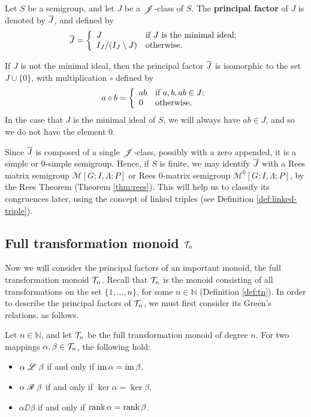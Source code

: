 \begin{definition}
  \label{def:princfact}
  Let $S$ be a semigroup, and let $J$ be a $\mathrel{\mathscr{J}}$-class of $S$.  The
  \textbf{principal factor} of $J$ is denoted by $\overline{J}$, and defined by
  $$\overline{J} = \left\{
    \begin{array}{l l}
      J & \text{if~}J\text{~is the minimal ideal}; \\
      I_J / (I_J \setminus J) & \text{otherwise}.
    \end{array}
  \right.$$
\end{definition}

If $J$ is not the minimal ideal, then the principal factor $\overline{J}$ is
isomorphic to the set $J \cup \{0\}$, with multiplication $\circ$ defined by
$$a \circ b = \left\{
  \begin{array}{l l}
    ab & \text{if~} a,b,ab \in J; \\
    0 & \text{otherwise}.
  \end{array}\right.$$
In the case that $J$ is the minimal ideal of $S$, we will always have
$ab \in J$, and so we do not have the element $0$.

Since $\overline{J}$ is composed of a single $\mathrel{\mathscr{J}}$-class, possibly with a zero
appended, it is a simple or 0-simple semigroup.  Hence, if $S$ is finite, we may
identify $\overline{J}$ with a Rees matrix semigroup $\mathcal{M}[G;I,\Lambda;P]$ or
Rees 0-matrix semigroup $\mathcal{M}^0[G;I,\Lambda;P]$, by the Rees Theorem
(Theorem \ref{thm:rees}).  This will help us to classify its congruences later,
using the concept of linked triples (see Definition \ref{def:linked-triple}).

\subsection{Full transformation monoid $\mathcal{T}_n$}
\label{sec:princfact-tn}

Now we will consider the principal factors of an important monoid, the full
transformation monoid $\mathcal{T}_n$.  Recall that $\mathcal{T}_n$ is the monoid consisting of
all transformations on the set $\{1, \dots, n\}$, for some $n \in \mathbb{N}$
(Definition \ref{def:tn}).  In order to describe the principal factors of
$\mathcal{T}_n$, we must first consider its Green's relations, as follows.

\begin{proposition}
  \label{prop:tn-greens}
  Let $n \in \mathbb{N}$, and let $\mathcal{T}_n$ be the full transformation monoid of
  degree $n$.  For two mappings $\alpha, \beta \in \mathcal{T}_n$, the following hold:
  \begin{itemize}
  \item $\alpha \mathrel{\mathscr{L}} \beta$ if and only if $\operatorname{im} \alpha = \operatorname{im} \beta$,
  \item $\alpha \mathrel{\mathscr{R}} \beta$ if and only if $\ker \alpha = \ker \beta$,
  \item $\alpha \DD \beta$ if and only if $\operatorname{rank} \alpha = \operatorname{rank} \beta$.
  \end{itemize}
\end{proposition}

